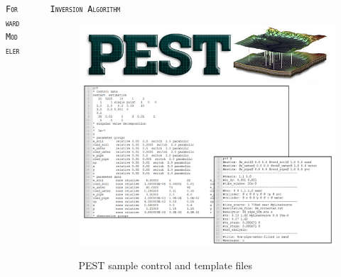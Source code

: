 \documentclass[final]{beamer}
\newlength{\sepwid}
\newlength{\onecolwid}
\newlength{\twocolwid}
\begin{document}
\begin{frame}[t]
\begin{columns}[t]
\begin{column}{\onecolwid}
\begin{block}{\textsc{\texttt{Forward Modeler}}}
\end{block}


\end{column} %

\begin{column}{\sepwid}\end{column} %

\begin{column}{\twocolwid} %

\begin{columns}[t,totalwidth=\twocolwid] %

\begin{column}{\onecolwid}\vspace{-.6in} %


\begin{block}{\textsc{\texttt{Inversion Algorithm}}}

\begin{figure}
	\includegraphics[width=0.8\linewidth]{PEST_flat.jpg}
	\vspace{1cm}
	\includegraphics[width=1.05\linewidth]{pest_image.png}
	\caption{PEST sample control and template files~\cite{pest}}
\end{figure}


\end{block}
\end{column}
\end{columns}
\end{column}
\end{columns}
\end{frame}
\end{document}
